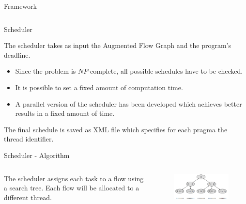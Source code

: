 \documentclass[xcolor=dvipsnames]{beamer}
\begin{document}
\begin{section}{Framework}
\begin{frame}{\hskip 0.3cm }
\begin{columns}
\begin{column}{3.5cm}
\end{column}
\end{columns}
\end{frame}



\begin{frame}{\hskip 0.3cm Scheduler }

The scheduler takes as input the Augmented Flow Graph and the program's deadline.

\begin{itemize}

\item Since the problem is $NP$-complete, all possible schedules have to be checked.

\item It is possible to set a fixed amount of computation time.

\item A parallel version of the scheduler has been developed which achieves better results in a fixed amount of time.

\end{itemize}

The final schedule is saved as XML file which specifies for each pragma the thread identifier.

\end{frame}







\begin{frame}{\hskip 0.3cm Scheduler - Algorithm}
\vskip -0.9cm
\begin{columns}

\begin{column}{6cm}

The scheduler assigns each task to a flow using a search tree. Each flow will be allocated to a different thread.

\end{column}

\begin{column}{4.5cm}

\begin{figure}
\centering
\includegraphics[scale=0.37]{search_tree.png}
\end{figure}
\end{column}



\end{columns}
\end{frame}
\end{section}
\end{document}
